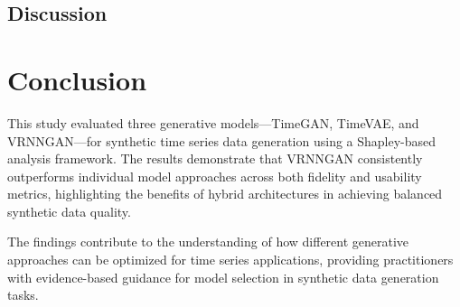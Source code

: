 \documentclass{article}
\begin{document}
\subsection{Discussion}

\section{Conclusion}

This study evaluated three generative models—TimeGAN, TimeVAE, and VRNNGAN—for synthetic time series data generation using a Shapley-based analysis framework. The results demonstrate that VRNNGAN consistently outperforms individual model approaches across both fidelity and usability metrics, highlighting the benefits of hybrid architectures in achieving balanced synthetic data quality.

The findings contribute to the understanding of how different generative approaches can be optimized for time series applications, providing practitioners with evidence-based guidance for model selection in synthetic data generation tasks.

\nocite{*}

\end{document}
